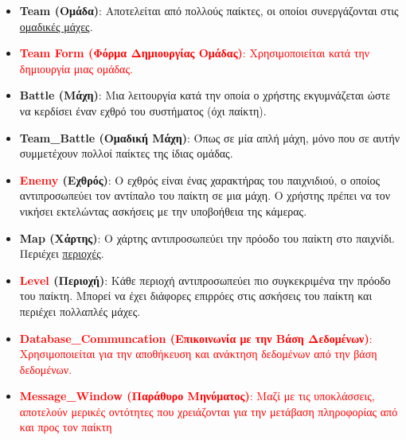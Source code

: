 \begin{itemize}
    \item \textbf{Team (Ομάδα)}: Αποτελείται από πολλούς παίκτες, οι οποίοι συνεργάζονται στις \underline{ομαδικές μάχες}.
    
    \item \textcolor{red}{\textbf{Team Form (Φόρμα Δημιουργίας Ομάδας)}: Χρησιμοποιείται κατά την δημιουργία μιας ομάδας.}
    
    \item \textbf{Battle (Μάχη)}: Μια λειτουργία κατά την οποία ο χρήστης εκγυμνάζεται ώστε να κερδίσει έναν εχθρό του συστήματος (όχι παίκτη).
    
    \item \textbf{Team\_Battle (Ομαδική Μάχη)}: Όπως σε μία απλή μάχη, μόνο που σε αυτήν συμμετέχουν πολλοί παίκτες της ίδιας ομάδας.
    
    \item \textbf{\textcolor{red}{Enemy} (Εχθρός)}: Ο εχθρός είναι ένας χαρακτήρας του παιχνιδιού, ο οποίος αντιπροσωπεύει τον αντίπαλο του παίκτη σε μια μάχη. Ο χρήστης πρέπει να τον νικήσει εκτελώντας ασκήσεις με την υποβοήθεια της κάμερας.
    
    \item \textbf{Map (Χάρτης)}: Ο χάρτης αντιπροσωπεύει την πρόοδο του παίκτη στο παιχνίδι. Περιέχει \underline{περιοχές}.
    
    \item \textbf{\textcolor{red}{Level} (Περιοχή)}: Κάθε περιοχή αντιπροσωπεύει πιο συγκεκριμένα την πρόοδο του παίκτη. Μπορεί να έχει διάφορες επιρρόες στις ασκήσεις του παίκτη και περιέχει πολλαπλές μάχες.
    
    \item \textcolor{red}{\textbf{Database\_Communcation (Επικοινωνία με την Βάση Δεδομένων)}: Χρησιμοποιείται για την αποθήκευση και ανάκτηση δεδομένων από την βάση δεδομένων.}
    
    \item \textcolor{red}{\textbf{Message\_Window (Παράθυρο Μηνύματος)}: Μαζί με τις υποκλάσσεις, αποτελούν μερικές οντότητες που χρειάζονται για την μετάβαση πληροφορίας από και προς τον παίκτη}
\end{itemize}

